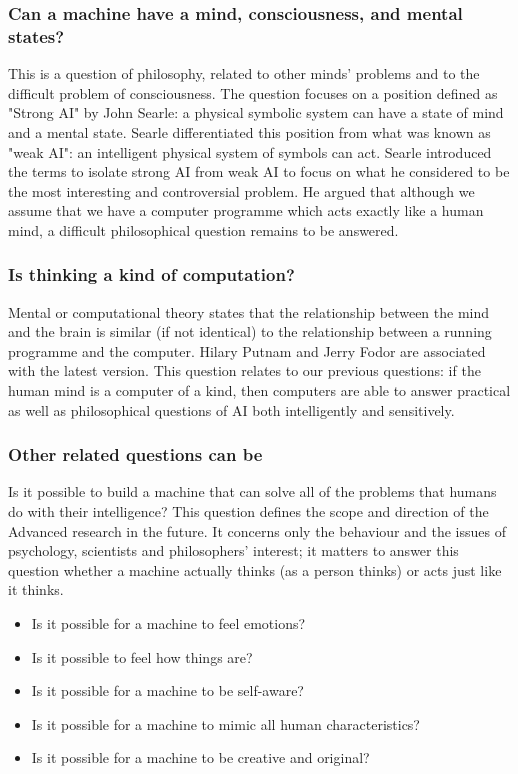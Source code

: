 \documentclass[13pt,letterpaper]{article}
\begin{document}
\subsubsection* {Can a machine have a mind, consciousness, and mental states?}This is a question of philosophy, related to other minds' problems and to the 
\nolinebreak[4]difficult problem of consciousness. The question focuses on a position defined as "Strong AI" by John Searle: a physical symbolic system can have a state of mind and a mental state.
Searle differentiated this position from what was known as "weak AI": an intelligent physical system of symbols can act.
Searle introduced the terms to isolate strong AI from weak AI to focus on what he considered to be the most interesting and controversial problem. He argued that although we assume that we have a computer programme which acts exactly like a human mind, a difficult philosophical question remains to be answered.
\nolinebreak[4]
\subsubsection* {Is thinking a kind of computation?}
Mental or computational theory states that the relationship between the mind and the brain is similar (if not identical) to the relationship between a running programme and the computer. Hilary Putnam and Jerry Fodor are associated with the latest version.
This question relates to our previous questions: if the human mind is a computer of a kind, then computers are able to answer practical as well as philosophical questions of AI both intelligently and sensitively.
\nolinebreak[4]
\subsubsection* {Other related questions can be}
Is it possible to build a machine that can solve all of the problems that humans do with their intelligence? This question defines the scope and direction of the Advanced research in the future. It concerns only the behaviour and the issues of psychology,  scientists and philosophers' interest; it matters to answer this question whether a machine actually thinks (as a person thinks) or acts just like it thinks.
\nolinebreak[4]
\begin{itemize}
  \item Is it possible for a machine to feel emotions?
  \item Is it possible to feel how things are?
  \item Is it possible for a machine to be self-aware?
  \item Is it possible for a machine to mimic all human characteristics?
  \item Is it possible for a machine to be creative and original?
\end{itemize}
\end{document}

